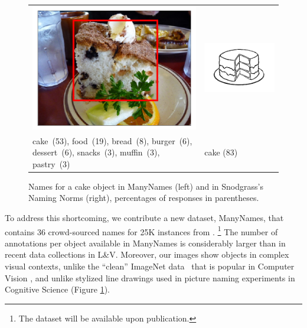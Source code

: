 \begin{figure}[tbp]
\scriptsize
\begin{tabular}{p{4.3cm}p{2cm}}
\centering
\includegraphics[scale=0.15]{figures/2390077_1254219_supercat_unique.png} &
\includegraphics[scale=0.4]{figures/snodgrass_vanderwart_cake_042.png}\\
 cake\ (53),  food\ (19), bread\ (8), burger\ (6), dessert\ (6), snacks\ (3), muffin\ (3),  pastry\ (3) & \hspace{.9cm} cake (83)
\end{tabular}
\caption{Names for a cake object in ManyNames (left) and in Snodgrass's Naming Norms (right), percentages of responses in parentheses.}
\label{fig:cake}
\end{figure}

To address this shortcoming, we contribute a new dataset, ManyNames, that contains 36 crowd-sourced names for 25K instances from \vgenome.%
\footnote{The dataset will be available upon publication.}
The number of annotations per object available in ManyNames is considerably larger than in recent data collections in L\&V.
Moreover, our images show objects in complex visual contexts,
unlike the ``clean'' ImageNet data~\cite{imagenet_cvpr09} that is popular in Computer Vision \cite{ILSVRC15}, and unlike stylized line drawings used in picture naming experiments in Cognitive Science (Figure \ref{fig:cake}).

